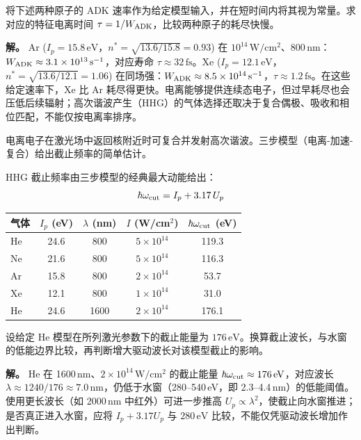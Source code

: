 \begin{exbox}[Ar 和 Xe 的隧穿电离率]
将下述两种原子的 ADK 速率作为给定模型输入，并在短时间内将其视为常量。求对应的特征电离时间 $\tau=1/W_{\rm ADK}$，比较两种原子的耗尽快慢。

\textbf{解。} Ar (\(I_p=15.8\,\mathrm{eV}\)，\(n^*=\sqrt{13.6/15.8}=0.93\)) 在 \(10^{14}\,\mathrm{W/cm^2}\)、800\,nm：\(W_{\rm ADK}\approx3.1\times10^{13}\,\mathrm{s^{-1}}\)，对应寿命 \(\tau\approx32\,\mathrm{fs}\)。Xe (\(I_p=12.1\,\mathrm{eV}\)，\(n^*=\sqrt{13.6/12.1}=1.06\)) 在同场强：\(W_{\rm ADK}\approx8.5\times10^{14}\,\mathrm{s^{-1}}\)，\(\tau\approx1.2\,\mathrm{fs}\)。在这些给定速率下，Xe 比 Ar 耗尽得更快。电离能够提供连续态电子，但过早耗尽也会压低后续辐射；高次谐波产生（HHG）的气体选择还取决于复合偶极、吸收和相位匹配，不能仅按电离率排序。
\end{exbox}

电离电子在激光场中返回核附近时可复合并发射高次谐波。三步模型（电离-加速-复合）给出截止频率的简单估计。

HHG 截止频率由三步模型的经典最大动能给出：
\[
\hbar\omega_{\rm cut}=I_p+3.17\,U_p
\]

\begin{center}
\begin{tabular}{lcccc}
\hline
气体 & \(I_p\) (eV) & \(\lambda\) (nm) & \(I\) (W/cm\(^2\)) & \(\hbar\omega_{\rm cut}\) (eV) \\
\hline
He & 24.6 & 800 & \(5\times10^{14}\) & 119.3 \\
Ne & 21.6 & 800 & \(5\times10^{14}\) & 116.3 \\
Ar & 15.8 & 800 & \(2\times10^{14}\) & 53.7 \\
Xe & 12.1 & 800 & \(1\times10^{14}\) & 31.0 \\
He & 24.6 & 1600 & \(2\times10^{14}\) & 176.1 \\
\hline
\end{tabular}
\end{center}

\begin{exbox}[He 的谐波截止与水窗阈值]
设给定 He 模型在所列激光参数下的截止能量为 $176\,\mathrm{eV}$。换算截止波长，与水窗的低能边界比较，再判断增大驱动波长对该模型截止的影响。

\textbf{解。} He 在 1600\,nm、\(2\times10^{14}\,\mathrm{W/cm^2}\) 的截止能量 \(\hbar\omega_{\rm cut}\approx176\,\mathrm{eV}\)，对应波长 \(\lambda\approx1240/176\approx7.0\,\mathrm{nm}\)，仍低于水窗（280--540\,eV，即 2.3--4.4\,nm）的低能阈值。使用更长波长（如 2000\,nm 中红外）可进一步推高 \(U_p\propto\lambda^2\)，使截止向水窗推进；是否真正进入水窗，应将 $I_p+3.17U_p$ 与 $280\,\mathrm{eV}$ 比较，不能仅凭驱动波长增加作出判断。
\end{exbox}

